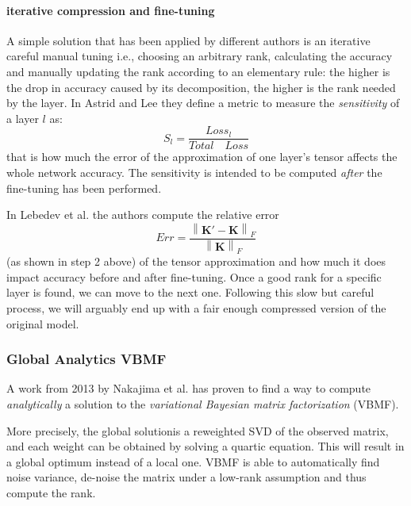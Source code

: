 \newline 
\paragraph{iterative compression and fine-tuning}
A simple solution that has been applied by different authors is an iterative careful manual tuning \parencite{astrid2017} \parencite{lebedev} i.e., choosing an arbitrary rank, calculating the accuracy and manually updating the rank according to an elementary rule: the higher is the drop in accuracy caused by its decomposition, the higher is the rank needed by the layer.
\newline 
In Astrid and Lee \parencite{astrid2017} they define a metric to measure the \emph{sensitivity} of a layer $l$ as:
\begin{equation}
	S_{l} = \frac{Loss_l}{Total \quad Loss}
\end{equation}
that is how much the error of the approximation of one layer's tensor affects the whole network accuracy. The sensitivity is intended to be computed \emph{after} the fine-tuning has been performed. 
\newline 

In Lebedev et al. \parencite{lebedev} the authors compute the relative error $$ Err = \frac{\left \| \mathbf{K'} - \mathbf{K}  \right \|_{F}}{\left \| \mathbf{K} \right \|_{F}}$$ (as shown in step 2 above) of the tensor approximation and how much it does impact accuracy before and after fine-tuning.  
Once a good rank for a specific layer is found, we can move to the next one. Following this slow but careful process, we will arguably end up with a fair enough compressed version of the original model. 

\subsubsection{Global Analytics VBMF}
A work from 2013 by Nakajima et al. \parencite{nakajima2013} has proven to find a way to compute \emph{analytically} a solution to the \emph{variational Bayesian matrix factorization} (VBMF). 

More precisely, the global solutionis a reweighted SVD of the observed matrix, and each weight can be obtained by solving a quartic equation. This will result in a global optimum instead of a local one. VBMF is able to  automatically find noise variance, de-noise the matrix under a low-rank assumption and thus compute the rank. 
\newline

